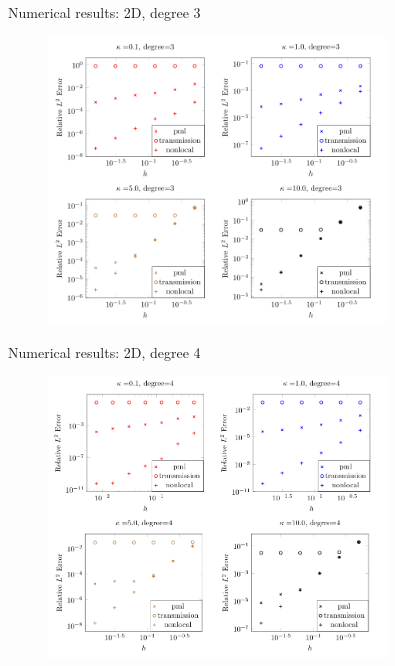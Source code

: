 \documentclass{beamer}
\begin{document}
\begin{frame}[noframenumbering]{Numerical results: 2D, degree 3}
    \begin{figure}[ht]
    \begin{center}
        \includegraphics[width=0.8\textwidth]{images/degree-3-accuracy.png}
    \end{center}
    \end{figure}
\end{frame}
\begin{frame}[noframenumbering]{Numerical results: 2D, degree 4}
    \begin{figure}[ht]
    \begin{center}
        \includegraphics[width=0.8\textwidth]{images/degree-4-accuracy.png}
    \end{center}
    \end{figure}
\end{frame}
\end{document}
